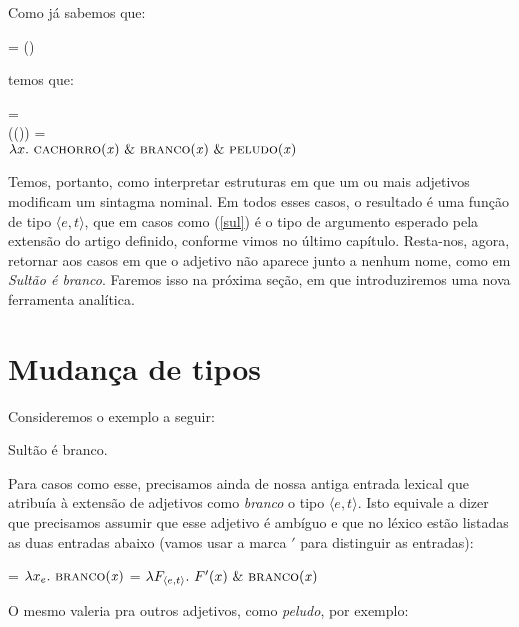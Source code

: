 \n Como já sabemos que:

\begin{exe}
	\ex {} = ()
\end{exe}

\n temos que:

\begin{exe}
	\ex {} = \\ (()) = \\
	$\lambda x.\ \predica{cachorro}{x}\ \&\ \predica{branco}{x}\ \&\ \predica{peludo}{x}$
\end{exe}



\n Temos, portanto, como interpretar estruturas em que um ou mais
adjetivos modificam um sintagma nominal. Em todos esses casos, o resultado é uma função de tipo $\langle e,t\rangle$, que em casos como (\ref{sul}) é o tipo de argumento esperado pela extensão do artigo definido, conforme vimos no último capítulo. Resta-nos, agora, retornar aos
casos em que o adjetivo não aparece junto a nenhum nome, como em \textit{Sultão é branco}. Faremos isso na próxima seção, em que introduziremos uma nova ferramenta analítica.

\section{Mudança de tipos}

Consideremos o exemplo a seguir:

\begin{exe}
	\ex Sultão é branco.\label{wer}
\end{exe}

\n Para casos como esse, precisamos ainda de nossa antiga entrada
lexical que atribuía à extensão de adjetivos como \textit{branco}
o tipo $\langle e,t\rangle$. Isto equivale a dizer que precisamos
assumir que esse adjetivo é ambíguo e que no léxico estão listadas
as duas entradas abaixo (vamos usar a marca $'$ para distinguir as
entradas):

\begin{exe}
	\ex
	\begin{xlist}
		\ex {} = $\lambda x_{e}.\ \predica{branco}{x}$
		\ex {} = $\lambda F_{\langle e,t\rangle}.\ F'(x)\ \&\ \text{\textsc{branco}(\textit{x})}$
	\end{xlist}
\end{exe}

\n O mesmo valeria pra outros adjetivos, como \textit{peludo}, por exemplo:


